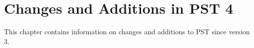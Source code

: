 \chapter{Changes and Additions in PST 4}
This chapter contains information on changes and additions to PST since version 3.















\pagebreak

\pagebreak

\pagebreak


\pagebreak











\pagebreak


